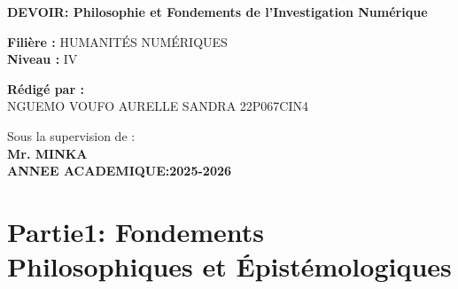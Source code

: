 \documentclass[12pt,a4paper]{article}
\begin{document}
\begin{titlepage}
		
		\vspace{1cm}
		
		\begin{center}
		
			\colorbox{blue!70}{\parbox{1\textwidth}{\centering
					\textbf{\color{white}{SEC 4031 \quad INTRODUCTION AUX TECHNIQUES D'INVESTTGATION NUMERIQUE }}
					}}
			\vspace{0.5cm}
			
			\colorbox{gray!30}{\parbox{0.9\textwidth}{\centering
					\textbf{DEVOIR: Philosophie et Fondements de l'Investigation Numérique }
			}}
		\end{center}
		
		\vspace{1cm}
		
		\noindent
		\textbf{Filière :} HUMANITÉS NUMÉRIQUES \\[0.5cm]
		\textbf{Niveau :} IV
		
		\vspace{1cm}
		
		\noindent
		\textbf{Rédigé par :} \\[0.5cm]
		\quad          NGUEMO VOUFO AURELLE SANDRA \hfill 22P067\hfill CIN4
		
		\vspace{2cm}
		
		\begin{center}
			Sous la supervision de : \\
			\textbf{\hfill Mr. MINKA}\\[1 cm]
			\textbf{ANNEE ACADEMIQUE:2025-2026}
		\end{center}
		
	\end{titlepage}
	\section*{Partie1: Fondements Philosophiques et Épistémologiques }
\end{document}
